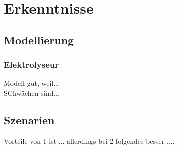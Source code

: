 \chapter{Erkenntnisse}
\label{cha:Erkenntnisse}

\section{Modellierung}
\label{sec:Sektion 1}

\subsection{Elektrolyseur}
\label{subsec:Abschnitt1}
Modell gut, weil...\\
SChwächen sind...\\

\section{Szenarien}
Vorteile von 1 ist ... allerdings bei 2 folgendes besser .... 